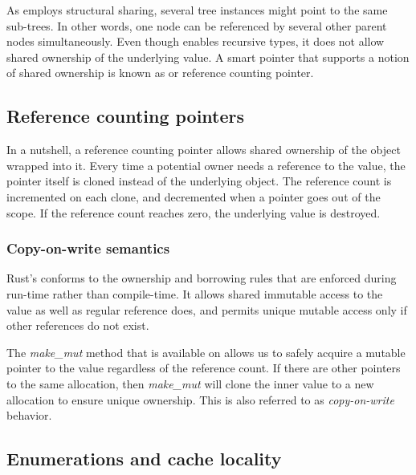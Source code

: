 As \rrbtree{} employs structural sharing, several tree instances might point to the same sub-trees. In other words, one node can be referenced by several other parent nodes simultaneously. Even though \boxptr{} enables recursive types, it does not allow shared ownership of the underlying value. A smart pointer that supports a notion of shared ownership is known as \rc{} or reference counting pointer.

\subsection{Reference counting pointers}
In a nutshell, a reference counting pointer allows shared ownership of the object wrapped into it. Every time a potential owner needs a reference to the value, the pointer itself is cloned instead of the underlying object. The reference count is incremented on each clone, and decremented when a pointer goes out of the scope. If the reference count reaches zero, the underlying value is destroyed.

\subsubsection*{Copy-on-write semantics}
Rust’s \rc{} conforms to the ownership and borrowing rules that are enforced during run-time rather than compile-time. It allows shared immutable access to the value as well as regular reference does, and permits unique mutable access only if other references do not exist. 

The \emph{make\_mut} method that is available on \rc{} allows us to safely acquire a mutable pointer to the value regardless of the reference count. If there are other pointers to the same allocation, then \emph{make\_mut} will clone the inner value to a new allocation to ensure unique ownership. This is also referred to as \emph{copy-on-write} behavior. 

\subsection{Enumerations and cache locality}


